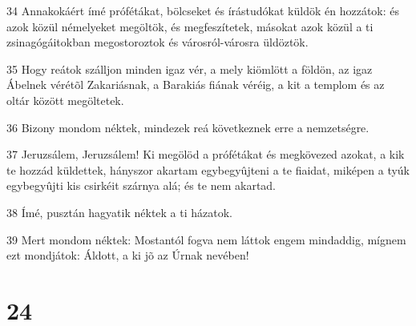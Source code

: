 \par 34 Annakokáért ímé prófétákat, bölcseket és írástudókat küldök én hozzátok: és azok közül némelyeket megöltök, és megfeszítetek, másokat azok közül a ti zsinagógáitokban megostoroztok és városról-városra üldöztök.
\par 35 Hogy reátok szálljon minden igaz vér, a mely kiömlött a földön, az igaz Ábelnek  vérétõl Zakariásnak, a Barakiás fiának véréig, a kit a templom és az oltár között megöltetek.
\par 36 Bizony mondom néktek, mindezek reá következnek erre a nemzetségre.
\par 37 Jeruzsálem, Jeruzsálem! Ki megölöd a prófétákat és megkövezed azokat, a kik te hozzád küldettek, hányszor akartam egybegyûjteni a te fiaidat, miképen a tyúk egybegyûjti kis csirkéit szárnya alá; és te nem akartad.
\par 38 Ímé, pusztán hagyatik néktek a ti házatok.
\par 39 Mert mondom néktek: Mostantól fogva nem láttok engem mindaddig, mígnem ezt mondjátok: Áldott,  a ki jõ az Úrnak nevében!

\chapter{24}

